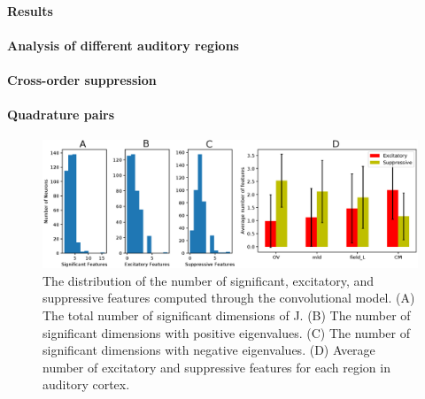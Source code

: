 \documentclass{article}
\begin{document}
\paragraph{Results}

\paragraph{Analysis of different auditory regions}
\paragraph{Cross-order suppression}
\paragraph{Quadrature pairs}

\begin{figure}
  \centering
  \includegraphics[width=1.0\linewidth]{Figures/Figure1.eps}
  \caption{The distribution of the number of significant, excitatory, and suppressive features computed through the convolutional model. (A) The total number of significant dimensions of J. (B) The number of significant dimensions with positive eigenvalues. (C) The number of significant dimensions with negative eigenvalues. (D) Average number of excitatory and suppressive features for each region in auditory cortex.}
\end{figure}
\end{document}
